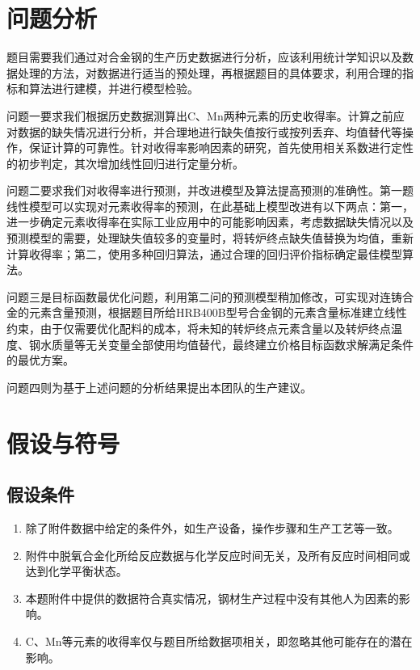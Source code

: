 \documentclass{xcumcmart}
\begin{document}
\section{问题分析}
\par 题目需要我们通过对合金钢的生产历史数据进行分析，应该利用统计学知识以及数据处理的方法，对数据进行适当的预处理，再根据题目的具体要求，利用合理的指标和算法进行建模，并进行模型检验。
\par 问题一要求我们根据历史数据测算出C、Mn两种元素的历史收得率。计算之前应对数据的缺失情况进行分析，并合理地进行缺失值按行或按列丢弃、均值替代等操作，保证计算的可靠性。针对收得率影响因素的研究，首先使用相关系数进行定性的初步判定，其次增加线性回归进行定量分析。
\par 问题二要求我们对收得率进行预测，并改进模型及算法提高预测的准确性。第一题线性模型可以实现对元素收得率的预测，在此基础上模型改进有以下两点：第一，进一步确定元素收得率在实际工业应用中的可能影响因素，考虑数据缺失情况以及预测模型的需要，处理缺失值较多的变量时，将转炉终点缺失值替换为均值，重新计算收得率；第二，使用多种回归算法，通过合理的回归评价指标确定最佳模型算法。
\par 问题三是目标函数最优化问题，利用第二问的预测模型稍加修改，可实现对连铸合金的元素含量预测，根据题目所给HRB400B型号合金钢的元素含量标准建立线性约束，由于仅需要优化配料的成本，将未知的转炉终点元素含量以及转炉终点温度、钢水质量等无关变量全部使用均值替代，最终建立价格目标函数求解满足条件的最优方案。
\par 问题四则为基于上述问题的分析结果提出本团队的生产建议。

\section{假设与符号}
\subsection{假设条件}
\begin{enumerate}[(1)]
\item 除了附件数据中给定的条件外，如生产设备，操作步骤和生产工艺等一致。
\item 附件中脱氧合金化所给反应数据与化学反应时间无关，及所有反应时间相同或达到化学平衡状态。
\item 本题附件中提供的数据符合真实情况，钢材生产过程中没有其他人为因素的影响。
\item C、Mn等元素的收得率仅与题目所给数据项相关，即忽略其他可能存在的潜在影响。
\end{enumerate}
\end{document}
